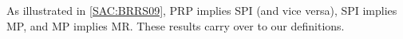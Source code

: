 

As illustrated in \ref{SAC:BRRS09}, PRP implies SPI (and vice versa), SPI implies MP, and MP implies MR. These results carry over to our definitions.